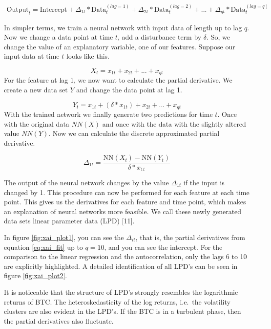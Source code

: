 \documentclass[
]{article}
\begin{document}
\begin{align} \label{eq:xai_fit}
\text{Output}_{t} = \text{Intercept} + \Delta_{1t}*\text{Data}^{(lag=1)}_{t} + \Delta_{2t}*\text{Data}^{(lag=2)}_{t} + ... + \Delta_{qt}*\text{Data}^{(lag=q)}_{t}
\end{align}  

In simpler terms, we train a neural network with input data of length up
to lag \(q\). Now we change a data point at time \(t\), add a
disturbance term by \(\delta\). So, we change the value of an
explanatory variable, one of our features. Suppose our input data at
time \(t\) looks like this.

\[X_{t} = x_{1t}+x_{2t}+...+x_{qt}\] For the feature at lag 1, we now
want to calculate the partial derivative. We create a new data set \(Y\)
and change the data point at lag 1.

\[Y_{t} = x_{1t}+(\delta*x_{1t})+x_{2t}+...+x_{qt}\] With the trained
network we finally generate two predictions for time \(t\). Once with
the original data \(NN(X)\) and once with the data with the slightly
altered value \(NN(Y)\). Now we can calculate the discrete approximated
partial derivative.

\[\Delta_{1t} = \frac{\text{NN}(X_{t}) - \text{NN}(Y_{t})}{\delta*x_{1t}}\]

The output of the neural network changes by the value \(\Delta_{1t}\) if
the input is changed by 1. This procedure can now be performed for each
feature at each time point. This gives us the derivatives for each
feature and time point, which makes an explanation of neural networks
more feasible. We call these newly generated data sets linear parameter
data (LPD) {[}11{]}.

\newpage

In figure \ref{fig:xai_plot1}, you can see the \(\Delta_{it}\), that is,
the partial derivatives from equation \ref{eq:xai_fit} up to \(q=10\),
and you can see the intercept. For the comparison to the linear
regression and the autocorrelation, only the lags 6 to 10 are explicitly
highlighted. A detailed identification of all LPD's can be seen in
figure \ref{fig:xai_plot2}.

It is noticeable that the structure of LPD's strongly resembles the
logarithmic returns of BTC. The heteroskedasticity of the log returns,
i.e.~the volatility clusters are also evident in the LPD's. If the BTC
is in a turbulent phase, then the partial derivatives also fluctuate.

~
\end{document}
